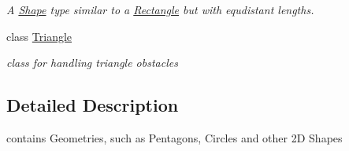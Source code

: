 \begin{DoxyCompactItemize}
\begin{DoxyCompactList}\small\item\em A \mbox{\hyperlink{class_geometry2_d_1_1_shape}{Shape}} type similar to a \mbox{\hyperlink{class_geometry2_d_1_1_rectangle}{Rectangle}} but with equdistant lengths. \end{DoxyCompactList}\item 
class \mbox{\hyperlink{class_geometry2_d_1_1_triangle}{Triangle}}
\begin{DoxyCompactList}\small\item\em class for handling triangle obstacles \end{DoxyCompactList}\end{DoxyCompactItemize}


\subsection{Detailed Description}
contains Geometries, such as Pentagons, Circles and other 2D Shapes 